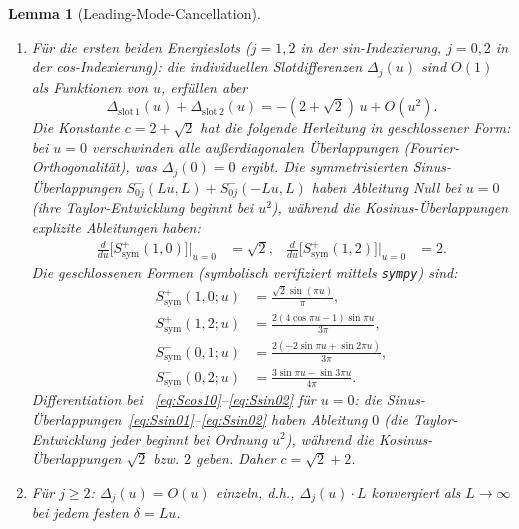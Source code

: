 \documentclass[12pt,a4paper]{article}
\newtheorem{lemma}[theorem]{Lemma}
\theoremstyle{definition}
\theoremstyle{remark}
\begin{document}
\begin{lemma}[Leading-Mode-Cancellation]
\label{lem:leading-cancel}
\begin{enumerate}[label=\textup{(\alph*)}]
  \item Für die ersten beiden Energieslots ($j = 1, 2$ in der sin-Indexierung, $j = 0, 2$ in der cos-Indexierung): die individuellen Slotdifferenzen $\Delta_j(u)$ sind $O(1)$ als Funktionen von $u$, erfüllen aber
  \begin{equation}
  \label{eq:pairwise-cancel}
    \Delta_{\mathrm{slot\,1}}(u) + \Delta_{\mathrm{slot\,2}}(u) = -(2 + \sqrt{2})\,u + O(u^2).
  \end{equation}
  Die Konstante $c = 2 + \sqrt{2}$ hat die folgende Herleitung in geschlossener Form: bei $u = 0$ verschwinden alle außerdiagonalen Überlappungen (Fourier-Orthogonalität), was $\Delta_j(0) = 0$ ergibt. Die symmetrisierten Sinus-Überlappungen $S^-_{0j}(Lu, L) + S^-_{0j}(-Lu, L)$ haben \emph{Ableitung Null} bei $u = 0$ (ihre Taylor-Entwicklung beginnt bei $u^2$), während die Kosinus-Überlappungen explizite Ableitungen haben:
  \begin{align*}
    \frac{d}{du}\bigl[S^+_{\mathrm{sym}}(1, 0)\bigr]\Big|_{u=0} &= \sqrt{2}, &
    \frac{d}{du}\bigl[S^+_{\mathrm{sym}}(1, 2)\bigr]\Big|_{u=0} &= 2.
  \end{align*}
  Die geschlossenen Formen (symbolisch verifiziert mittels \texttt{sympy}) sind:
  \begin{align}
    S^+_{\mathrm{sym}}(1,0;u) &= \frac{\sqrt{2}\sin(\pi u)}{\pi}, \label{eq:Scos10} \\
    S^+_{\mathrm{sym}}(1,2;u) &= \frac{2(4\cos\pi u - 1)\sin\pi u}{3\pi}, \label{eq:Scos12} \\
    S^-_{\mathrm{sym}}(0,1;u) &= \frac{2(-2\sin\pi u + \sin 2\pi u)}{3\pi}, \label{eq:Ssin01} \\
    S^-_{\mathrm{sym}}(0,2;u) &= \frac{3\sin\pi u - \sin 3\pi u}{4\pi}. \label{eq:Ssin02}
  \end{align}
  Differentiation bei ~\eqref{eq:Scos10}--\eqref{eq:Ssin02} für $u = 0$: die Sinus-Überlappungen~\eqref{eq:Ssin01}--\eqref{eq:Ssin02} haben Ableitung $0$ (die Taylor-Entwicklung jeder beginnt bei Ordnung $u^2$), während die Kosinus-Überlappungen $\sqrt{2}$ bzw. $2$ geben. Daher $c = \sqrt{2} + 2$.
  \item Für $j \geq 2$: $\Delta_j(u) = O(u)$ einzeln, d.h., $\Delta_j(u) \cdot L$ konvergiert als $L \to \infty$ bei jedem festen $\delta = Lu$.
\end{enumerate}
\end{lemma}
\end{document}
